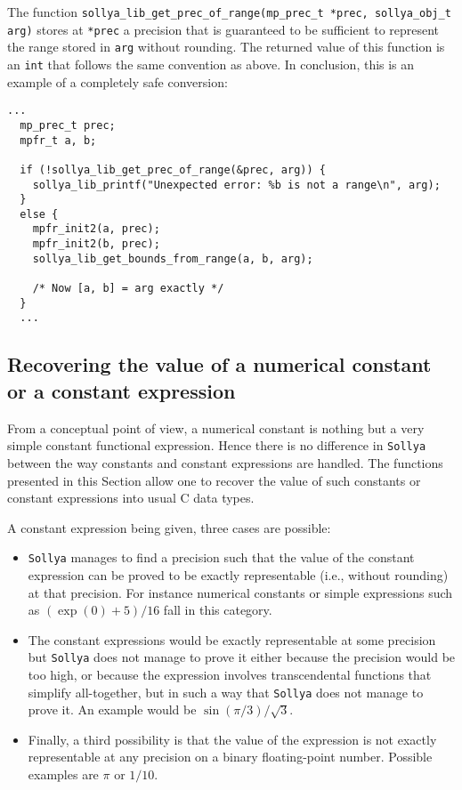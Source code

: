 \documentclass[a4paper]{article}
\newcommand{\sollya}{\texttt{Sollya}\xspace}
\begin{document}
The function  \verb|sollya_lib_get_prec_of_range(mp_prec_t *prec, sollya_obj_t arg)| stores at \verb|*prec| a precision that is guaranteed to be sufficient to represent the range stored in \verb|arg| without rounding. The returned value of this function is an \verb|int| that follows the same convention as above. In conclusion, this is an example of a completely safe conversion:

\begin{center}\begin{minipage}{15cm}\begin{Verbatim}[frame=single]
  ...
  mp_prec_t prec;
  mpfr_t a, b;

  if (!sollya_lib_get_prec_of_range(&prec, arg)) {
    sollya_lib_printf("Unexpected error: %b is not a range\n", arg);
  }
  else {
    mpfr_init2(a, prec);
    mpfr_init2(b, prec);
    sollya_lib_get_bounds_from_range(a, b, arg);

    /* Now [a, b] = arg exactly */
  }
  ...
\end{Verbatim}
\end{minipage}\end{center}

\subsection{Recovering the value of a numerical constant or a constant expression}
From a conceptual point of view, a numerical constant is nothing but a very simple constant functional expression. Hence there is no difference in \sollya between the way constants and constant expressions are handled. The functions presented in this Section allow one to recover the value of such constants or constant expressions into usual C data types.

A constant expression being given, three cases are possible:
\begin{itemize}
\item \sollya manages to find a precision such that the value of the constant expression can be proved to be exactly representable (i.e., without rounding) at that precision. For instance numerical constants or simple expressions such as $(\exp(0)+5)/16$ fall in this category.
\item The constant expressions would be exactly representable at some precision but \sollya does not manage to prove it either because the precision would be too high, or because the expression involves transcendental functions that simplify all-together, but in such a way that \sollya does not manage to prove it. An example would be $\sin(\pi/3)/\sqrt{3}$.
\item Finally, a third possibility is that the value of the expression is not exactly representable at any precision on a binary floating-point number. Possible examples are $\pi$ or $1/10$.
\end{itemize}
\end{document}

